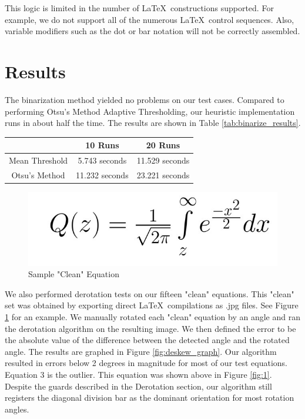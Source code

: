 \documentclass[journal]{IEEEtran}
\begin{document}
This logic is limited in the number of \LaTeX\ constructions supported. For example, we do not support all of the numerous \LaTeX\ control sequences. Also, variable modifiers such as the dot or bar notation will not be correctly assembled.

\section{Results}
The binarization method yielded no problems on our test cases. Compared to performing Otsu's Method Adaptive Thresholding, our heuristic implementation runs in about half the time. The results are shown in Table \ref{tab:binarize_results}.
\begin{center}
\begin{minipage}{\columnwidth}
     \label{tab:binarize_results} 
    \centering
    \begin{tabular}{|c|c|c|}
        \hline
        & 10 Runs &	20 Runs \\
        \hline
         Mean Threshold &	5.743 seconds &	11.529 seconds\\
        \hline
        Otsu’s Method	& 11.232 seconds &23.221 seconds\\
        \hline
    \end{tabular}    
\end{minipage}
\end{center}

\begin{figure}[!t]
    \centering
    \includegraphics[width=\columnwidth]{clean}
    \caption{Sample "Clean" Equation}
    \label{fig:clean}
\end{figure}

We also performed derotation tests on our fifteen "clean" equations. This "clean" set was obtained by exporting direct \LaTeX\ compilations as .jpg files. See Figure \ref{fig:clean} for an example. We manually rotated each "clean" equation by an angle and ran the derotation algorithm on the resulting image. We then defined the error to be the absolute value of the difference between the detected angle and the rotated angle. The results are graphed in Figure \ref{fig:deskew_graph}. Our algorithm resulted in errors below 2 degrees in magnitude for most of our test equations. Equation 3 is the outlier. This equation was shown above in Figure \ref{fig:1}. Despite the guards described in the Derotation section, our algorithm still registers the diagonal division bar as the dominant orientation for most rotation angles.
\end{document}
